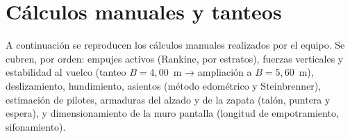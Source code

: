 \chapter{Cálculos manuales y tanteos}
\label{anx:calculos}

A continuación se reproducen los cálculos manuales realizados por el equipo.
Se cubren, por orden: empujes activos (Rankine, por estratos),
fuerzas verticales y estabilidad al vuelco (tanteo $B=4{,}00$~m → ampliación a
$B=5{,}60$~m), deslizamiento, hundimiento, asientos (método edométrico y
Steinbrenner), estimación de pilotes, armaduras del alzado y de la zapata
(talón, puntera y espera), y dimensionamiento de la muro pantalla
(longitud de empotramiento, sifonamiento).




